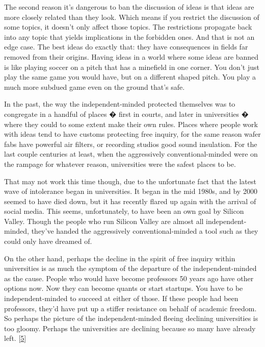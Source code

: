 The second reason it's dangerous to ban the
                  discussion of ideas is that ideas are more closely related
                  than they look. Which means if you restrict the discussion of
                  some topics, it doesn't only affect those topics. The
                  restrictions propagate back into any topic that yields
                  implications in the forbidden ones. And that is not an edge
                  case. The best ideas do exactly that: they have consequences
                  in fields far removed from their origins. Having ideas in a
                  world where some ideas are banned is like playing soccer on a
                  pitch that has a minefield in one corner. You don't just play
                  the same game you would have, but on a different shaped pitch.
                  You play a much more subdued game even on the ground that's
                  safe.

In the past, the way the independent-minded
                  protected themselves was to congregate in a handful of places
                  � first in courts, and later in universities � where they
                  could to some extent make their own rules. Places where people
                  work with ideas tend to have customs protecting free inquiry,
                  for the same reason wafer fabs have powerful air filters, or
                  recording studios good sound insulation. For the last couple
                  centuries at least, when the aggressively conventional-minded
                  were on the rampage for whatever reason, universities were the
                  safest places to be.

That may not work this time
                  though, due to the unfortunate fact that the latest wave of
                  intolerance began in universities. It began in the mid 1980s,
                  and by 2000 seemed to have died down, but it has recently
                  flared up again with the arrival of social media. This seems,
                  unfortunately, to have been an own goal by Silicon Valley.
                  Though the people who run Silicon Valley are almost all
                  independent-minded, they've handed the aggressively
                  conventional-minded a tool such as they could only have
                  dreamed of.

On the other hand, perhaps the decline
                  in the spirit of free inquiry within universities is as much
                  the symptom of the departure of the independent-minded as the
                  cause. People who would have become professors 50 years ago
                  have other options now. Now they can become quants or start
                  startups. You have to be independent-minded to succeed at
                  either of those. If these people had been professors, they'd
                  have put up a stiffer resistance on behalf of academic
                  freedom. So perhaps the picture of the independent-minded
                  fleeing declining universities is too gloomy. Perhaps the
                  universities are declining because so many have already left.
                  [\href{\#f5n}{5}]

